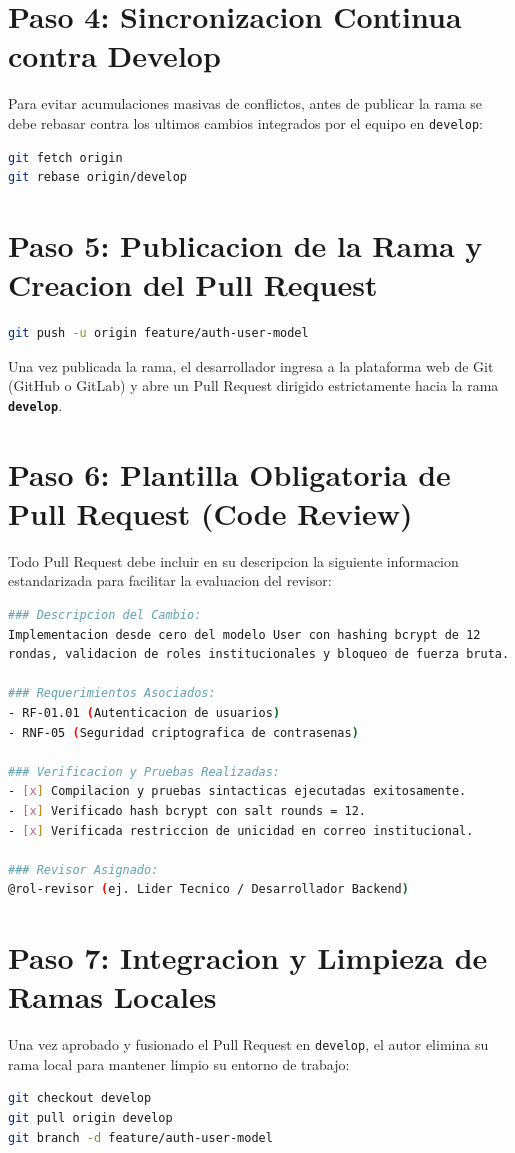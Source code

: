 \documentclass[12pt,a4paper]{report}
\begin{document}
\section{Paso 4: Sincronizacion Continua contra Develop}
Para evitar acumulaciones masivas de conflictos, antes de publicar la rama se debe rebasar contra los ultimos cambios integrados por el equipo en \texttt{develop}:
\begin{lstlisting}[language=bash]
git fetch origin
git rebase origin/develop
\end{lstlisting}

\section{Paso 5: Publicacion de la Rama y Creacion del Pull Request}
\begin{lstlisting}[language=bash]
git push -u origin feature/auth-user-model
\end{lstlisting}
Una vez publicada la rama, el desarrollador ingresa a la plataforma web de Git (GitHub o GitLab) y abre un Pull Request dirigido estrictamente hacia la rama \textbf{\texttt{develop}}.

\section{Paso 6: Plantilla Obligatoria de Pull Request (Code Review)}
Todo Pull Request debe incluir en su descripcion la siguiente informacion estandarizada para facilitar la evaluacion del revisor:
\begin{lstlisting}[language=bash]
### Descripcion del Cambio:
Implementacion desde cero del modelo User con hashing bcrypt de 12
rondas, validacion de roles institucionales y bloqueo de fuerza bruta.

### Requerimientos Asociados:
- RF-01.01 (Autenticacion de usuarios)
- RNF-05 (Seguridad criptografica de contrasenas)

### Verificacion y Pruebas Realizadas:
- [x] Compilacion y pruebas sintacticas ejecutadas exitosamente.
- [x] Verificado hash bcrypt con salt rounds = 12.
- [x] Verificada restriccion de unicidad en correo institucional.

### Revisor Asignado:
@rol-revisor (ej. Lider Tecnico / Desarrollador Backend)
\end{lstlisting}

\section{Paso 7: Integracion y Limpieza de Ramas Locales}
Una vez aprobado y fusionado el Pull Request en \texttt{develop}, el autor elimina su rama local para mantener limpio su entorno de trabajo:
\begin{lstlisting}[language=bash]
git checkout develop
git pull origin develop
git branch -d feature/auth-user-model
\end{lstlisting}
\end{document}
